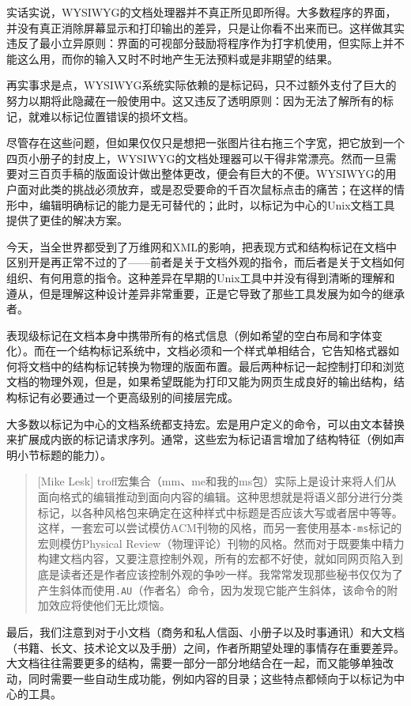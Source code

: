 \documentclass[12pt,oneside]{ctexbook}
\begin{document}
\begin{common-format}
实话实说，WYSIWYG的文档处理器并不真正所见即所得。大多数程序的界面，并没有真正消除屏幕显示和打印输出的差异，只是让你看不出来而已。这样做其实违反了最小立异原则：界面的可视部分鼓励将程序作为打字机使用，但实际上并不能这么用，而你的输入又时不时地产生无法预料或是非期望的结果。

再实事求是点，WYSIWYG系统实际依赖的是标记码，只不过额外支付了巨大的努力以期将此隐藏在一般使用中。这又违反了透明原则：因为无法了解所有的标记，就难以标记位置错误的损坏文档。

尽管存在这些问题，但如果仅仅只是想把一张图片往右拖三个字宽，把它放到一个四页小册子的封皮上，WYSIWYG的文档处理器可以干得非常漂亮。然而一旦需要对三百页手稿的版面设计做出整体更改，便会有巨大的不便。WYSIWYG的用户面对此类的挑战必须放弃，或是忍受要命的千百次鼠标点击的痛苦；在这样的情形中，编辑明确标记的能力是无可替代的；此时，以标记为中心的Unix文档工具提供了更佳的解决方案。

今天，当全世界都受到了万维网和XML的影响，把表现方式和结构标记在文档中区别开是再正常不过的了——前者是关于文档外观的指令，而后者是关于文档如何组织、有何用意的指令。这种差异在早期的Unix工具中并没有得到清晰的理解和遵从，但是理解这种设计差异非常重要，正是它导致了那些工具发展为如今的继承者。

表现级标记在文档本身中携带所有的格式信息（例如希望的空白布局和字体变化）。而在一个结构标记系统中，文档必须和一个样式单相结合，它告知格式器如何将文档中的结构标记转换为物理的版面布置。最后两种标记一起控制打印和浏览文档的物理外观，但是，如果希望既能为打印又能为网页生成良好的输出结构，结构标记有必要通过一个更高级别的间接层完成。

大多数以标记为中心的文档系统都支持宏。宏是用户定义的命令，可以由文本替换来扩展成内嵌的标记请求序列。通常，这些宏为标记语言增加了结构特征（例如声明小节标题的能力）。

\begin{quote}[Mike Lesk]
troff宏集合（mm、me和我的ms包）实际上是设计来将人们从面向格式的编辑推动到面向内容的编辑。这种思想就是将语义部分进行分类标记，以各种风格包来确定在这种样式中标题是否应该大写或者居中等等。这样，一套宏可以尝试模仿ACM刊物的风格，而另一套使用基本\verb+-ms+标记的宏则模仿Physical Review（物理评论）刊物的风格。然而对于既要集中精力构建文档内容，又要注意控制外观，所有的宏都不好使，就如同网页陷入到底是读者还是作者应该控制外观的争吵一样。我常常发现那些秘书仅仅为了产生斜体而使用\verb+.AU+（作者名）命令，因为发现它能产生斜体，该命令的附加效应将使他们无比烦恼。
\end{quote}

最后，我们注意到对于小文档（商务和私人信函、小册子以及时事通讯）和大文档（书籍、长文、技术论文以及手册）之间，作者所期望处理的事情存在重要差异。大文档往往需要更多的结构，需要一部分一部分地结合在一起，而又能够单独改动，同时需要一些自动生成功能，例如内容的目录；这些特点都倾向于以标记为中心的工具。


\end{common-format}
\end{document}
